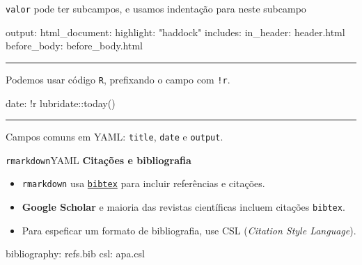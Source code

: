 \documentclass[
  10pt,
  ignorenonframetext,
]{beamer}
\newenvironment{Shaded}{\begin{snugshade}}{\end{snugshade}}
\newcommand{\AttributeTok}[1]{\textcolor[rgb]{0.40,0.45,0.13}{#1}}
\newcommand{\FunctionTok}[1]{\textcolor[rgb]{0.28,0.35,0.67}{#1}}
\newcommand{\KeywordTok}[1]{\textcolor[rgb]{0.00,0.23,0.31}{#1}}
\newcommand{\StringTok}[1]{\textcolor[rgb]{0.13,0.47,0.30}{#1}}
\providecommand{\tightlist}{%
  \setlength{\itemsep}{0pt}\setlength{\parskip}{0pt}}\usepackage{longtable,booktabs,array}
\newcommand*{\regrafina}{\rule{\textwidth}{0.5pt}}
\begin{document}
\begin{frame}[fragile]
\texttt{valor} pode ter subcampos, e usamos indentação para neste
subcampo

\begin{Shaded}
\begin{Highlighting}[]
\FunctionTok{output}\KeywordTok{:}
\AttributeTok{  }\FunctionTok{html\_document}\KeywordTok{:}
\AttributeTok{    }\FunctionTok{highlight}\KeywordTok{:}\AttributeTok{ }\StringTok{"haddock"}
\AttributeTok{    }\FunctionTok{includes}\KeywordTok{:}
\AttributeTok{      }\FunctionTok{in\_header}\KeywordTok{:}\AttributeTok{ header.html}
\AttributeTok{      }\FunctionTok{before\_body}\KeywordTok{:}\AttributeTok{ before\_body.html        }
\end{Highlighting}
\end{Shaded}

\regrafina

Podemos usar código \texttt{R}, prefixando o campo com \texttt{!r}.

\begin{Shaded}
\begin{Highlighting}[]
\FunctionTok{date}\KeywordTok{:}\AttributeTok{ !r lubridate::today()}
\end{Highlighting}
\end{Shaded}

\regrafina

Campos comuns em YAML: \texttt{title}, \texttt{date} e \texttt{output}.
\end{frame}

\begin{frame}[fragile]{\texttt{rmarkdown}\newline YAML}
\protect\hypertarget{rmarkdownyaml-1}{}
\textbf{Citações e bibliografia}

\begin{itemize}
\tightlist
\item
  \texttt{rmarkdown} usa \href{https://tug.org/bibtex/}{\texttt{bibtex}}
  para incluir referências e citações.
\item
  \textbf{Google Scholar} e maioria das revistas científicas incluem
  citações \texttt{bibtex}.
\item
  Para espeficar um formato de bibliografia, use CSL (\emph{Citation
  Style Language}).
\end{itemize}

\begin{Shaded}
\begin{Highlighting}[]
\FunctionTok{bibliography}\KeywordTok{:}\AttributeTok{ refs.bib}
\FunctionTok{csl}\KeywordTok{:}\AttributeTok{ apa.csl}
\end{Highlighting}
\end{Shaded}
\end{frame}
\end{document}
